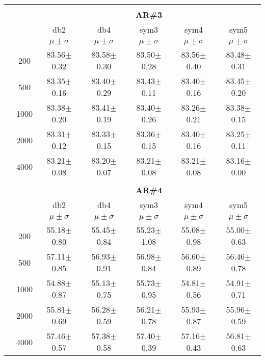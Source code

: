 \begin{table}[H]
\begin{tabular}{|c|c|c c c c c|}
	

 \\ \midrule
\multicolumn{7}{c}{}\\ 



\cline{3-7}
\multicolumn{2}{c|}{\multirow{3}{*}{}} & \multicolumn{5}{c|}{\textbf{AR\#3}}   \\\cline{3-7} 
\multicolumn{2}{c|}{}  & db2 & db4 & sym3 & sym4 & sym5 \\\cline{3-7}%
\multicolumn{2}{c|}{}& $\mu \pm \sigma$ & $\mu \pm \sigma$ & $\mu \pm \sigma$ & $\mu \pm \sigma$ & $\mu \pm \sigma$ \\\hline

\multicolumn{1}{|c|}{ \multirow{5}{*}{\rotatebox[origin=c]{90}{\textbf{Neurônios}}} }
& 200	&83.56$\pm$0.32	&83.58$\pm$0.30	&83.50$\pm$0.28	&83.56$\pm$0.40	&83.48$\pm$0.31 \\\cline{2-7}
& 500	&83.35$\pm$0.16	&83.40$\pm$0.29	&83.43$\pm$0.11	&83.40$\pm$0.16	&83.45$\pm$0.20	\\\cline{2-7}
& 1000	&83.38$\pm$0.20	&83.41$\pm$0.19	&83.40$\pm$0.26	&83.26$\pm$0.21	&83.38$\pm$0.15	\\\cline{2-7}
& 2000	&83.31$\pm$0.12	&83.33$\pm$0.15	&83.36$\pm$0.15	&83.40$\pm$0.16	&83.25$\pm$0.11	\\\cline{2-7}
& 4000	&83.21$\pm$0.08	&83.20$\pm$0.07 &83.21$\pm$0.08	&83.21$\pm$0.08	&83.16$\pm$0.00	\\\midrule

\multicolumn{7}{c}{}\\ 



\cline{3-7}
\multicolumn{2}{c|}{\multirow{3}{*}{}} & \multicolumn{5}{c|}{\textbf{AR\#4}}   \\\cline{3-7} 
\multicolumn{2}{c|}{}  & db2 & db4 & sym3 & sym4 & sym5 \\\cline{3-7}%
\multicolumn{2}{c|}{}& $\mu \pm \sigma$ & $\mu \pm \sigma$ & $\mu \pm \sigma$ & $\mu \pm \sigma$ & $\mu \pm \sigma$ \\\hline
\multicolumn{1}{|c|}{ \multirow{5}{*}{\rotatebox[origin=c]{90}{\textbf{Neurônios}}} }
&200	&55.18$\pm$0.80	&55.45$\pm$0.84	&55.23$\pm$1.08	&55.08$\pm$0.98	&55.00$\pm$0.63	\\\cline{2-7}
&500	&57.11$\pm$0.85	&56.93$\pm$0.91	&56.98$\pm$0.84	&56.60$\pm$0.89	&56.46$\pm$0.78	\\\cline{2-7}
&1000	&54.88$\pm$0.87	&55.13$\pm$0.75	&55.73$\pm$0.95	&54.81$\pm$0.56	&54.91$\pm$0.71	\\\cline{2-7}
&2000	&55.81$\pm$0.69	&56.28$\pm$0.59	&56.21$\pm$0.78	&55.93$\pm$0.87	&55.96$\pm$0.59	\\\cline{2-7}
&4000	&57.46$\pm$0.57	&57.38$\pm$0.58	&57.40$\pm$0.39	&57.16$\pm$0.43	&56.81$\pm$0.63	
 \\\midrule
\end{tabular}
\end{table}



